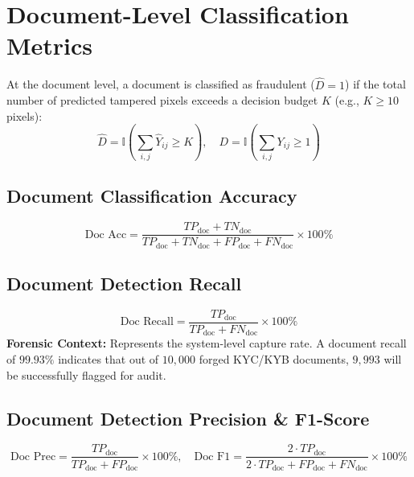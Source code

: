 \documentclass[11pt,a4paper]{article}
\begin{document}
\section{Document-Level Classification Metrics}
At the document level, a document is classified as fraudulent ($\hat{D} = 1$) if the total number of predicted tampered pixels exceeds a decision budget $K$ (e.g., $K \ge 10$ pixels):
\begin{equation}
\hat{D} = \mathbb{I}\left( \sum_{i,j} \hat{Y}_{ij} \ge K \right), \quad D = \mathbb{I}\left( \sum_{i,j} Y_{ij} \ge 1 \right)
\end{equation}

\subsection{Document Classification Accuracy}
\begin{equation}
\text{Doc Acc} = \frac{TP_{\text{doc}} + TN_{\text{doc}}}{TP_{\text{doc}} + TN_{\text{doc}} + FP_{\text{doc}} + FN_{\text{doc}}} \times 100\%
\end{equation}

\subsection{Document Detection Recall}
\begin{equation}
\text{Doc Recall} = \frac{TP_{\text{doc}}}{TP_{\text{doc}} + FN_{\text{doc}}} \times 100\%
\end{equation}
\textbf{Forensic Context:} Represents the system-level capture rate. A document recall of $99.93\%$ indicates that out of $10,000$ forged KYC/KYB documents, $9,993$ will be successfully flagged for audit.

\subsection{Document Detection Precision \& F1-Score}
\begin{equation}
\text{Doc Prec} = \frac{TP_{\text{doc}}}{TP_{\text{doc}} + FP_{\text{doc}}} \times 100\%, \quad \text{Doc F1} = \frac{2 \cdot TP_{\text{doc}}}{2 \cdot TP_{\text{doc}} + FP_{\text{doc}} + FN_{\text{doc}}} \times 100\%
\end{equation}
\end{document}
